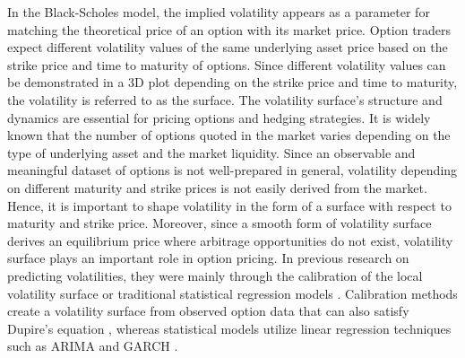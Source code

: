 \documentclass{article}
\begin{document}
{
In the Black-Scholes model, the implied volatility appears as a parameter for matching the theoretical price of an option with its market price. 
Option traders expect different volatility values of the same  underlying asset price based on the strike price and time to maturity of options. 
Since different volatility values can be demonstrated in a 3D plot depending on the strike price and time to maturity, the volatility is referred to as the surface. 
The volatility surface's structure and dynamics are essential for pricing options and hedging strategies.
It is widely known that the number of options quoted in the market varies depending on the type of underlying asset and the market liquidity.
Since an observable and meaningful dataset of options is not well-prepared in general, volatility depending on different maturity and strike prices is not easily derived from the market.
Hence, it is important to shape volatility in the form of a surface with respect to maturity and strike price. 
Moreover, since a smooth form of volatility surface derives an equilibrium price where arbitrage opportunities do not exist, volatility surface plays an important role in option pricing.
}
In previous research on predicting volatilities, they were mainly through the calibration of the local volatility surface or traditional statistical regression models \citep{granger2003forecasting}. Calibration methods create a volatility surface from observed option data that can also satisfy Dupire's equation \citep{avellaneda1997calib, andersen1998the, calib, bondarenko2018calib}, whereas statistical models utilize linear regression techniques such as ARIMA and GARCH \citep{factors, linreg}. 
\end{document}
